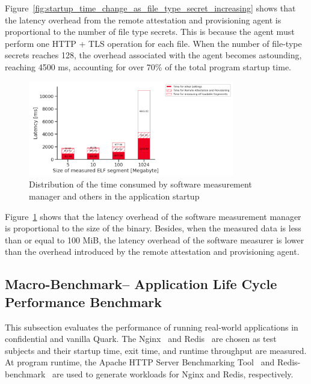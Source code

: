 Figure~\ref{fig:startup_time_change_as_file_type_secret_increasing} shows that the latency overhead from the remote attestation and provisioning agent is proportional to the number of file type secrets. 
This is because the agent must perform one HTTP + TLS operation for each file. When the number of file-type secrets reaches 128, the overhead associated with the agent becomes astounding, reaching 4500 ms, accounting for over 70\% of the total program startup time.
\begin{figure}[!htb]
    \centering
    \includegraphics[width=0.8\textwidth]{images/startup_time_change_as_elf_size_increasing.PNG}
    \caption[Distribution of the time consumed by software measurement manager and others in the Application Startup]{Distribution of the time consumed by software measurement manager and others in the application startup}
    \label{fig:startup_time_change_as_elf_size_increasing}
\end{figure}


Figure~\ref{fig:startup_time_change_as_elf_size_increasing} shows that the latency overhead of the software measurement manager is proportional to the size of the binary. Besides, when the measured data is less than or equal to 100 MiB, the latency overhead of the software measurer is lower than the 
overhead introduced by the remote attestation and provisioning agent.


\subsection{Macro-Benchmark– Application Life Cycle Performance Benchmark}
\label{macri_app_start_up}

This subsection evaluates the performance of running real-world applications in confidential and vanilla Quark. The Nginx~\cite*{nginx} and Redis~\cite*{redis} are chosen as test subjects and their startup time, exit time, and runtime throughput are measured. At program runtime, the Apache HTTP 
Server Benchmarking Tool~\cite*{ab} and Redis-benchmark~\cite*{Redis_benchmark} are used to generate workloads for Nginx and Redis, respectively.

